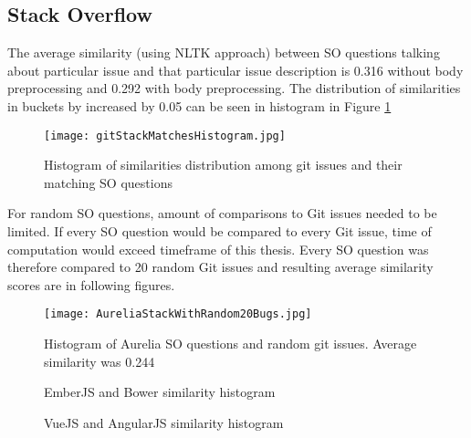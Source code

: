 \subsection{Stack Overflow}
The average similarity (using NLTK approach) between SO questions talking about particular issue and that particular issue description is 0.316 without body preprocessing and 0.292 with body preprocessing. The distribution of similarities in buckets by increased by 0.05 can be seen in histogram in Figure \ref{fig:GitStackMatchesHistogram}

\begin{figure}[H]%
    \centering
	\texttt{[image: gitStackMatchesHistogram.jpg]}
    \caption{Histogram of similarities distribution among git issues and their matching SO questions}%
    \label{fig:GitStackMatchesHistogram}%
\end{figure}

For random SO questions, amount of comparisons to Git issues needed to be limited. If every SO question would be compared to every Git issue, time of computation would exceed timeframe of this thesis. Every SO question was therefore compared to 20 random Git issues and resulting average similarity scores are in following figures.

\begin{figure}[H]%
    \centering
	\texttt{[image: AureliaStackWithRandom20Bugs.jpg]}
    \caption{Histogram of Aurelia SO questions and random git issues. Average similarity was 0.244}%
    \label{fig:AureliaStackWithRandom3Bugs}%
\end{figure}

\begin{figure}[H]%
    \centering
    \qquad
    \caption{EmberJS and Bower similarity histogram}%
    \label{fig:BowerEmberWithRandom3Bugs}%
\end{figure}

\begin{figure}[H]%
    \centering
    \qquad
    \caption{VueJS and AngularJS similarity histogram}%
    \label{fig:VueAngularWithRandom3Bugs}%
\end{figure}


